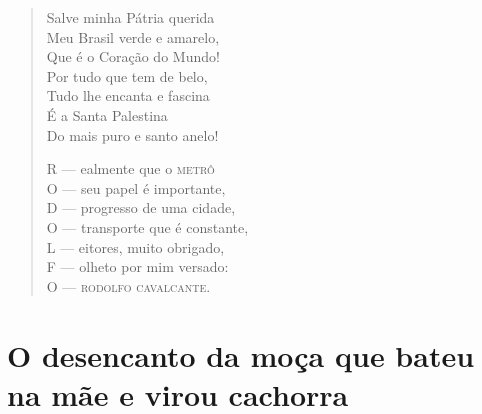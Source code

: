 \begin{verse}
Salve minha Pátria querida \\
Meu Brasil verde e amarelo, \\
Que é o Coração do Mundo! \\
Por tudo que tem de belo, \\
Tudo lhe encanta e fascina \\
É a Santa Palestina \\
Do mais puro e santo anelo! 
\pagebreak

R --- ealmente que o \textsc{metrô} \\
O --- seu papel é importante, \\
D --- progresso de uma cidade, \\
O --- transporte que é constante, \\
L --- eitores, muito obrigado, \\
F --- olheto por mim versado:\\
O --- \textsc{rodolfo cavalcante}. 
\end{verse}

\chapter{O desencanto da moça que bateu na mãe e virou cachorra}


